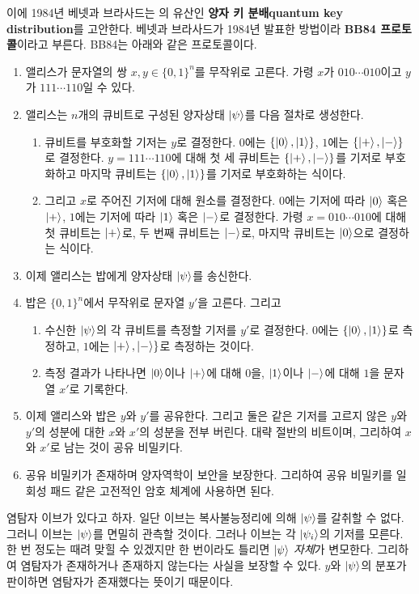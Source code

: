 \documentclass[a4paper,chapter,atbegshi]{oblivoir}
\begin{document}
이에 1984년 베넷과 브라사드는 의 유산인 \textbf{양자 키
분배\tiny quantum key distribution}를 고안한다. 베넷과 브라사드가 1984년
발표한 방법이라 \textbf{BB84 프로토콜}이라고 부른다. BB84는 아래와 같은 
프로토콜이다.
\begin{mdframed}
\begin{enumerate}[label=(\Alph*)]
  \item 앨리스가 문자열의 쌍 $x,y\in\{0,1\}^n$를 무작위로 고른다. 가령 $x$가
    $010\cdots010$이고 $y$가 $111\cdots110$일 수 있다.
  \item 앨리스는 $n$개의 큐비트로 구성된 양자상태 $\ket{\psi}$를 다음 절차로
    생성한다. 
    \begin{enumerate}[label=(\roman*)]
      \item 큐비트를 부호화할 기저는 $y$로 결정한다. 
    $0$에는 $\{\ket0,\ket1\}$, $1$에는 $\{\ket+,\ket-\}$로 결정한다.
    $y=111\cdots110$에 대해 첫 세 큐비트는 $\{\ket+,
    \ket-\}$를 기저로 부호화하고 마지막 큐비트는 $\{\ket0,\ket1\}$를 기저로 
    부호화하는 식이다. 
      \item 그리고 $x$로 주어진 기저에 대해 원소를 결정한다.
    $0$에는 기저에 따라 $\ket0$ 혹은 $\ket+$, $1$에는 기저에 따라 $\ket1$ 혹은
    $\ket-$로 결정한다. 가령 $x=010\cdots010$에 대해 첫 큐비트는 $\ket+$로,
    두 번째 큐비트는 $\ket-$로, 마지막 큐비트는 $\ket0$으로 결정하는 식이다.
  \end{enumerate}
  \item 이제 앨리스는 밥에게 양자상태 $\ket{\psi}$를 송신한다. 
  \item 밥은 $\{0,1\}^n$에서 무작위로 문자열 $y'$을 고른다. 그리고 
    \begin{enumerate}[label=(\roman*)] 
      \item 수신한 $\ket{\psi}$의 각 큐비트를 측정할 기저를
  $y'$로 결정한다. $0$에는 $\{\ket0,\ket1\}$로 측정하고, $1$에는 $\ket+,\ket-\}$로
  측정하는 것이다. 
    \item 측정 결과가 나타나면 $\ket0$이나 $\ket+$에
    대해 $0$을, $\ket1$이나 $\ket-$에 대해 $1$을 문자열 $x'$로 기록한다.
  \end{enumerate}
  \item 이제 앨리스와 밥은 $y$와 $y'$를 공유한다. 그리고 둘은 같은 기저를
    고르지 않은 $y$와 $y'$의 성분에 대한 $x$와 $x'$의 성분을 전부 버린다.
    대략 절반의 비트이며, 그리하여  $x$와 $x'$로 남는 것이 공유 비밀키다.
  \item 공유 비밀키가 존재하며 양자역학이 보안을 보장한다. 그리하여 
    공유 비밀키를 일회성 패드 같은 고전적인 암호 체계에 사용하면 된다.
\end{enumerate}
\end{mdframed}
염탐자 이브가 있다고 하자. 일단 이브는 복사불능정리에 의해 $\ket{\psi}$를
갈취할 수 없다. 그러니 이브는 $\ket{\psi}$를 면밀히 관측할
것이다. 그러나 이브는 각 $\ket{\psi_i}$의 기저를 모른다. 한 번
정도는 때려 맞힐 수 있겠지만 한 번이라도 틀리면 $\ket{\psi}$ \emph{자체}가
변모한다. 그리하여 염탐자가 존재하거나 존재하지 않는다는 사실을 보장할
수 있다. $y$와 $\ket{\psi}$의 분포가 판이하면 염탐자가 존재했다는 뜻이기 때문이다.
\end{document}
